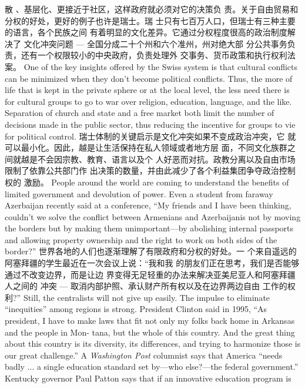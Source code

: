 \begin{paracol}{2}
散 、基层化、更接近于社区，这样政府就必须对它的决策负
责。关于自由贸易和分权的好处，更好的例子也许是瑞士。瑞
士只有七百万人口，但瑞士有三种主要的语言，各个民族之间
有着明显的文化差异。它通过分权程度很高的政治制度解决了
文化冲突问题 --- 全国分成二十个州和六个准州，州对绝大部
分公共事务负责，还有一个权限较小的中央政府，负责处理外
交事务、货币政策和执行权利法案。
\switchcolumn*
One of the key insights offered by the Swiss system is that
cultural conflicts can be minimized when they don't become political conflicts. Thus, the more of life that is kept in the private
sphere or at the local level, the less need there is for cultural groups to go to war over religion, education, language, and the
like. Separation of church and state and a free market both limit
the number of decisions made in the public sector, thus reducing
the incentive for groups to vie for political control.
\switchcolumn
瑞士体制的关键启示是文化冲突如果不变成政治冲突，它
就可以最小化。因此，越是让生活保持在私人领域或者地方层
面，不同文化族群之间就越是不会因宗教、教育、语言以及个
人好恶而对抗。政教分离以及自由市场限制了依靠公共部门作
出决策的数量，并由此减少了各个利益集团争夺政治控制权的
激励。
\switchcolumn*
People around the world are coming to understand the benefits of limited government and devolution of power. Even a student from faraway Azerbaijan recently said at a conference,
``My friends and I have been thinking, couldn't we solve the
conflict between Armenians and Azerbaijanis not by moving
the borders but by making them unimportant---by abolishing
internal passports and allowing property ownership and the
right to work on both sides of the border?''
\switchcolumn
世界各地的人们也逐渐理解了有限政府和分权的好处。一
个来自遥远的阿塞拜疆的学生最近在一次会议上说：“我和我
的朋友们正在思考，我们是否能够通过不改变边界，而是让边
界变得无足轻重的办法来解决亚美尼亚人和阿塞拜疆人之间的
冲突 --- 取消内部护照、承认财产所有权以及在边界两边自由
工作的权利?”
\switchcolumn*
Still, the centralists will not give up easily. The impulse to
eliminate ``inequities'' among regions is strong. President Clinton said in 1995, ``As president, I have to make laws that fit not
only my folks back home in Arkansas and the people in Mon-
tana, but the whole of this country. And the great thing about
this country is its diversity, its differences, and trying to harmonize those is our great challenge.'' A \textit{Washington Post} columnist
says that America ``needs badly $\ldots$ a single education standard
set by---who else?---the federal government.'' Kentucky governor Paul Patton says that if an innovative education program is

\end{paracol}
